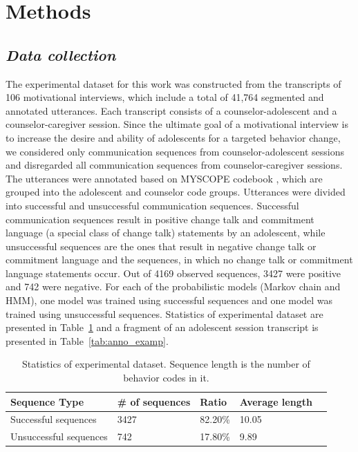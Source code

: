 \documentclass{amia_summit_2018}
\begin{document}
\section*{Methods}
\subsection*{\textit{Data collection}}
The experimental dataset for this work was constructed from the transcripts of 106 motivational interviews, which include a total of 41,764 segmented and annotated utterances. Each transcript consists of a counselor-adolescent and a counselor-caregiver session. Since the ultimate goal of a motivational interview is to increase the desire and ability of adolescents for a targeted behavior change, we considered only communication sequences from counselor-adolescent sessions and disregarded all communication sequences from counselor-caregiver sessions. The utterances were annotated based on MYSCOPE codebook \cite{carcone2013provider}, which are grouped into the adolescent and counselor code groups. Utterances were divided into successful and unsuccessful communication sequences. Successful communication sequences result in positive change talk and commitment language (a special class of change talk) statements by an adolescent, while unsuccessful sequences are the ones that result in negative change talk or commitment language and the sequences, in which no change talk or commitment language statements occur. Out of 4169 observed sequences, 3427 were positive and 742 were negative. For each of the probabilistic models (Markov chain and HMM), one model was trained using successful sequences and one model was trained using unsuccessful sequences. Statistics of experimental dataset are presented in Table~\ref{tab:data_dist} and a fragment of an adolescent session transcript is presented in Table~\ref{tab:anno_examp}. \\

\begin{table}[h]
\centering
\caption{Statistics of experimental dataset. Sequence length is the number of behavior codes in it.}
\label{tab:data_dist}
  \begin{tabular}{|l|l|l|l|l|}
  \hline
   \textbf{Sequence Type} & \textbf{\# of sequences}  & \textbf{Ratio} & \textbf{Average length} \\ \hline      
Successful sequences & 3427 & 82.20\% & 10.05 \\\hline
Unsuccessful sequences & 742 & 17.80\% & 9.89 \\\hline
  \end{tabular}
\end{table} 
\end{document}
